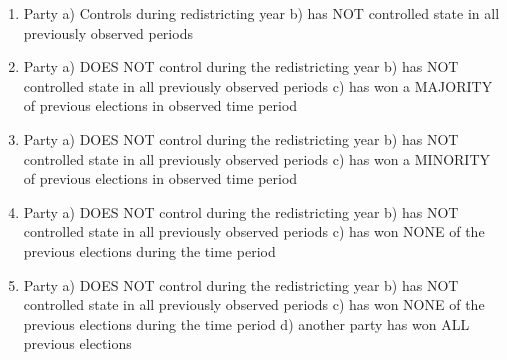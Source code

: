 \documentclass[]{article}
\newenvironment{Shaded}{\begin{snugshade}}{\end{snugshade}}
\newcommand{\CommentTok}[1]{\textcolor[rgb]{0.56,0.35,0.01}{\textit{#1}}}
\newcommand{\DataTypeTok}[1]{\textcolor[rgb]{0.13,0.29,0.53}{#1}}
\newcommand{\DecValTok}[1]{\textcolor[rgb]{0.00,0.00,0.81}{#1}}
\newcommand{\KeywordTok}[1]{\textcolor[rgb]{0.13,0.29,0.53}{\textbf{#1}}}
\newcommand{\NormalTok}[1]{#1}
\newcommand{\OperatorTok}[1]{\textcolor[rgb]{0.81,0.36,0.00}{\textbf{#1}}}
\newcommand{\OtherTok}[1]{\textcolor[rgb]{0.56,0.35,0.01}{#1}}
\newcommand{\StringTok}[1]{\textcolor[rgb]{0.31,0.60,0.02}{#1}}
\begin{document}
\begin{enumerate}
\def\labelenumi{\arabic{enumi}.}
\setcounter{enumi}{1}
\item
  Party a) Controls during redistricting year b) has NOT controlled
  state in all previously observed periods
\item
  Party a) DOES NOT control during the redistricting year b) has NOT
  controlled state in all previously observed periods c) has won a
  MAJORITY of previous elections in observed time period
\item
  Party a) DOES NOT control during the redistricting year b) has NOT
  controlled state in all previously observed periods c) has won a
  MINORITY of previous elections in observed time period
\item
  Party a) DOES NOT control during the redistricting year b) has NOT
  controlled state in all previously observed periods c) has won NONE of
  the previous elections during the time period
\item
  Party a) DOES NOT control during the redistricting year b) has NOT
  controlled state in all previously observed periods c) has won NONE of
  the previous elections during the time period d) another party has won
  ALL previous elections
\end{enumerate}

\begin{Shaded}
\end{Shaded}
\end{document}
